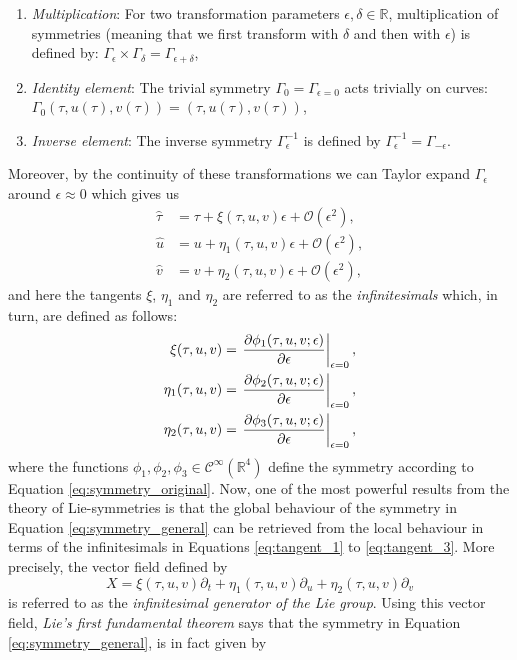 \begin{enumerate}
    \item \textit{Multiplication}: For two transformation parameters $\epsilon,\delta\in\mathbb{R}$, multiplication of symmetries (meaning that we first transform with $\delta$ and then with $\epsilon$) is defined by: $\Gamma_\epsilon\times\Gamma_\delta=\Gamma_{\epsilon+\delta}$,
    \item \textit{Identity element}: The trivial symmetry $\Gamma_0=\Gamma_{\epsilon=0}$ acts trivially on curves: $\Gamma_0 (\tau,u(\tau),v(\tau))=(\tau,u(\tau),v(\tau))$,
    \item \textit{Inverse element}: The inverse symmetry $\Gamma^{-1}_{\epsilon}$ is defined by $\Gamma^{-1}_{\epsilon}=\Gamma_{-\epsilon}$.
\end{enumerate}
Moreover, by the continuity of these transformations we can Taylor expand $\Gamma_{\epsilon}$ around $\epsilon\approx 0$ which gives us
\begin{align}
  \hat{\tau}&=\tau+\xi(\tau,u,v)\epsilon+\mathcal{O}(\epsilon^2),\\
  \hat{u}&=u+\eta_1(\tau,u,v)\epsilon+\mathcal{O}(\epsilon^2),\\
  \hat{v}&=v+\eta_2(\tau,u,v)\epsilon+\mathcal{O}(\epsilon^2),
\end{align}
and here the tangents $\xi$, $\eta_1$ and $\eta_2$ are referred to as the \textit{infinitesimals} which, in turn, are defined as follows:
\begin{align}
  \xi(\tau,u,v)&=\left.\pdv{\phi_1(\tau,u,v;\epsilon)}{\epsilon}\right|_{\epsilon=0},\label{eq:tangent_1}\\
  \eta_1(\tau,u,v)&=\left.\pdv{\phi_2(\tau,u,v;\epsilon)}{\epsilon}\right|_{\epsilon=0},\label{eq:tangent_2}\\
  \eta_2(\tau,u,v)&=\left.\pdv{\phi_3(\tau,u,v;\epsilon)}{\epsilon}\right|_{\epsilon=0},\label{eq:tangent_3}
\end{align}
where the functions $\phi_1,\phi_2,\phi_3\in\mathcal{C}^{\infty}(\mathbb{R}^{4})$ define the symmetry according to Equation \eqref{eq:symmetry_original}. Now, one of the most powerful results from the theory of Lie-symmetries is that the global behaviour of the symmetry in Equation \eqref{eq:symmetry_general} can be retrieved from the local behaviour in terms of the infinitesimals in Equations \eqref{eq:tangent_1} to \eqref{eq:tangent_3}. More precisely, the vector field defined by
\begin{equation}
X=\xi(\tau,u,v)\partial_t+\eta_1(\tau,u,v)\partial_u+\eta_2(\tau,u,v)\partial_v
  \label{eq:generator}
\end{equation}
is referred to as the \textit{infinitesimal generator of the Lie group}. Using this vector field, \textit{Lie's first fundamental theorem} \cite{bluman1989symmetries} says that the symmetry in Equation \eqref{eq:symmetry_general}, is in fact given by

